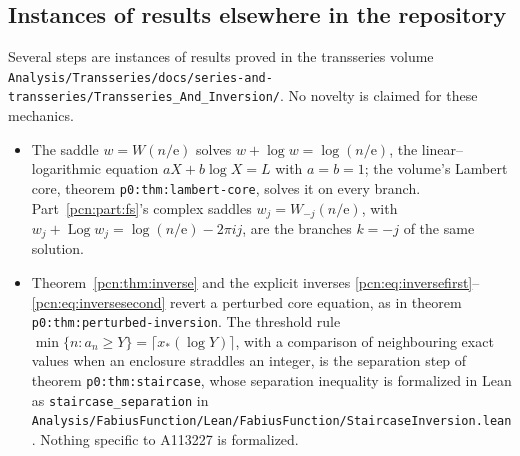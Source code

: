 \documentclass[11pt,letterpaper]{article}
\theoremstyle{remark}\newtheorem{remark}[theorem]{Remark}
\newcommand{\ee}{\mathrm e}
\newcommand{\Log}{\operatorname{Log}}
\newcommand{\repopath}[1]{\nolinkurl{#1}}
\begin{document}
\subsection*{Instances of results elsewhere in the repository}
\label{pcn:guide:lambert}
Several steps are instances of results proved in the transseries volume \repopath{Analysis/Transseries/docs/series-and-transseries/Transseries_And_Inversion/}. No novelty is claimed for these mechanics.
\begin{itemize}
\item The saddle $w=W(n/\ee)$ solves $w+\log w=\log(n/\ee)$, the linear--logarithmic equation $aX+b\log X=L$ with $a=b=1$; the volume's Lambert core, theorem \texttt{p0:thm:lambert-core}, solves it on every branch. Part~\ref{pcn:part:fs}'s complex saddles $w_j=W_{-j}(n/\ee)$, with $w_j+\Log w_j=\log(n/\ee)-2\pi ij$, are the branches $k=-j$ of the same solution.
\item Theorem~\ref{pcn:thm:inverse} and the explicit inverses \eqref{pcn:eq:inversefirst}--\eqref{pcn:eq:inversesecond} revert a perturbed core equation, as in theorem \texttt{p0:thm:perturbed-inversion}. The threshold rule $\min\{n:a_n\ge Y\}=\lceil x_*(\log Y)\rceil$, with a comparison of neighbouring exact values when an enclosure straddles an integer, is the separation step of theorem \texttt{p0:thm:staircase}, whose separation inequality is formalized in Lean as \texttt{staircase\_separation} in \repopath{Analysis/FabiusFunction/Lean/FabiusFunction/StaircaseInversion.lean}. Nothing specific to A113227 is formalized.
\end{itemize}
\end{document}
